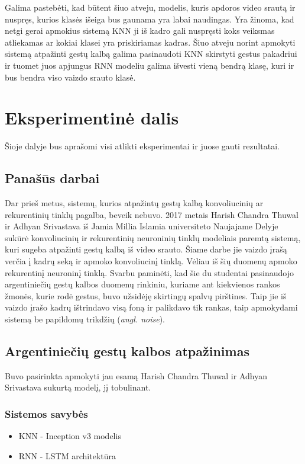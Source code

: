 \documentclass{VUMIFPSbakalaurinis}
\begin{document}
Galima pastebėti, kad būtent šiuo atveju, modelis, kuris apdoros video srautą ir nuspręs, kurios klasės išeiga bus gaunama yra labai naudingas. Yra žinoma, kad netgi gerai apmokius sistemą KNN ji iš kadro gali nuspręsti koks veiksmas atliekamas ar kokiai klasei yra priskiriamas kadras. Šiuo atveju norint apmokyti sistemą atpažinti gestų kalbą galima pasinaudoti KNN skirstyti gestus pakadriui ir tuomet juos apjungus RNN modeliu galima išvesti vieną bendrą klasę, kuri ir bus bendra viso vaizdo srauto klasė.

\section{Eksperimentinė dalis}

Šioje dalyje bus aprašomi visi atlikti eksperimentai ir juose gauti rezultatai.

\subsection{Panašūs darbai}
Dar prieš metus, sistemų, kurios atpažintų gestų kalbą konvoliucinių ar rekurentinių tinklų pagalba, beveik nebuvo. 2017 metais Harish Chandra Thuwal ir Adhyan Srivastava iš Jamia Millia Islamia universiteto Naujajame Delyje sukūrė konvoliucinių ir rekurentinių neuroninių tinklų modeliais paremtą sistemą, kuri sugeba atpažinti gestų kalbą iš video srauto. Šiame darbe jie vaizdo įrašą verčia į kadrų seką ir apmoko konvoliucinį tinklą. Vėliau iš šių duomenų apmoko rekurentinį neuroninį tinklą. Svarbu paminėti, kad šie du studentai pasinaudojo argentiniečių gestų kalbos duomenų rinkiniu, kuriame ant kiekvienos rankos žmonės, kurie rodė gestus, buvo užsidėję skirtingų spalvų pirštines. Taip jie iš vaizdo įrašo kadrų ištrindavo visą foną ir palikdavo tik rankas, taip apmokydami sistemą be papildomų trikdžių (\textit{angl. noise}).

\subsection{Argentiniečių gestų kalbos atpažinimas}

Buvo pasirinkta apmokyti jau esamą Harish Chandra Thuwal ir Adhyan Srivastava sukurtą modelį, jį tobulinant.

\subsubsection{Sistemos savybės}
\begin{itemize}
	\item KNN - Inception v3 modelis
	\item RNN - LSTM architektūra
\end{itemize}
\end{document}
